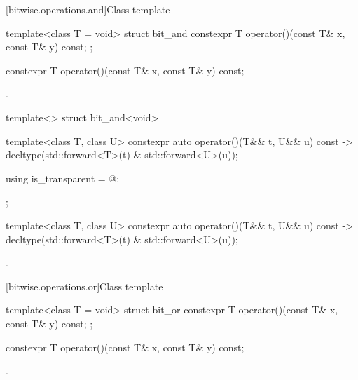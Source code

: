 [bitwise.operations.and]{Class template }

%
\begin{itemdecl}
template<class T = void> struct bit_and {
  constexpr T operator()(const T& x, const T& y) const;
};
\end{itemdecl}

%
\begin{itemdecl}
constexpr T operator()(const T& x, const T& y) const;
\end{itemdecl}

\begin{itemdescr}
\pnum
\returns
{}.
\end{itemdescr}

%
\begin{itemdecl}
template<> struct bit_and<void> {
  template<class T, class U> constexpr auto operator()(T&& t, U&& u) const
    -> decltype(std::forward<T>(t) & std::forward<U>(u));

  using is_transparent = @\unspec@;
};
\end{itemdecl}

%
\begin{itemdecl}
template<class T, class U> constexpr auto operator()(T&& t, U&& u) const
  -> decltype(std::forward<T>(t) & std::forward<U>(u));
\end{itemdecl}

\begin{itemdescr}
\pnum
\returns
{}.
\end{itemdescr}

[bitwise.operations.or]{Class template }

%
\begin{itemdecl}
template<class T = void> struct bit_or {
  constexpr T operator()(const T& x, const T& y) const;
};
\end{itemdecl}

%
\begin{itemdecl}
constexpr T operator()(const T& x, const T& y) const;
\end{itemdecl}

\begin{itemdescr}
\pnum
\returns
{}.
\end{itemdescr}

